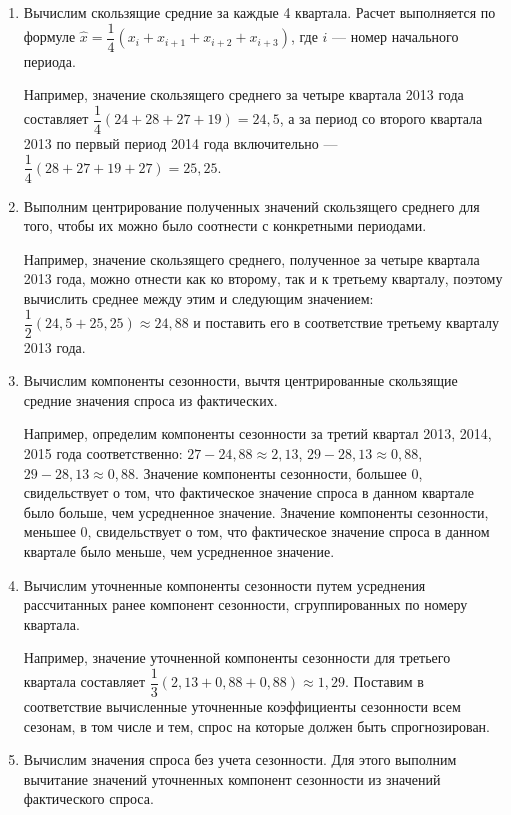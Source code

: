 \begin{enumerate}
\item Вычислим скользящие средние за каждые 4 квартала.
  Расчет выполняется по формуле
  \( \hat{x} = \dfrac{1}{4} (x_{i} + x_{i+1} + x_{i+2} + x_{i+3}) \),
  где \( i \) --- номер начального периода.

  Например, значение скользящего среднего за четыре квартала
  2013 года составляет \( \dfrac{1}{4} (24 + 28 + 27 + 19) = 24{,}5 \),
  а за период со второго квартала 2013 по первый период 2014 года
  включительно --- \( \dfrac{1}{4} (28 + 27 + 19 + 27) = 25{,}25 \).

\item Выполним центрирование полученных значений скользящего среднего
  для того, чтобы их можно было соотнести с конкретными периодами.

  Например, значение скользящего среднего, полученное за четыре квартала
  2013 года, можно отнести как ко второму, так и к третьему кварталу,
  поэтому вычислить среднее между этим и следующим значением:
  \( \dfrac{1}{2} (24{,}5 + 25{,}25) \approx 24{,}88 \) и поставить его
  в соответствие третьему кварталу 2013 года.

\item Вычислим компоненты сезонности,
  вычтя центрированные скользящие средние значения спроса из фактических.

  Например, определим компоненты сезонности за третий квартал
  2013, 2014, 2015 года соответственно:
  \( 27 - 24{,}88 \approx 2{,}13 \),
  \( 29 - 28{,}13 \approx 0{,}88 \),
  \( 29 - 28{,}13 \approx 0{,}88 \).
  Значение компоненты сезонности, большее 0, свидельствует о том, что
  фактическое значение спроса в данном квартале было больше,
  чем усредненное значение.
  Значение компоненты сезонности, меньшее 0, свидельствует о том, что
  фактическое значение спроса в данном квартале было меньше,
  чем усредненное значение.

\item Вычислим уточненные компоненты сезонности путем усреднения
  рассчитанных ранее компонент сезонности,
  сгруппированных по номеру квартала.

  Например,
  значение уточненной компоненты сезонности для третьего квартала составляет
  \( \dfrac{1}{3} (2{,}13 + 0{,}88 + 0{,}88) \approx 1{,}29 \).
  Поставим в соответствие
  вычисленные уточненные коэффициенты сезонности всем сезонам,
  в том числе и тем,
  спрос на которые должен быть спрогнозирован.

\item Вычислим значения спроса без учета сезонности.
  Для этого выполним вычитание значений уточненных компонент сезонности из
  значений фактического спроса.


\end{enumerate}
